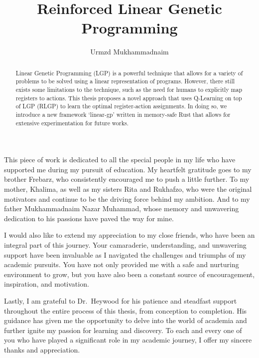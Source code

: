 \documentclass[12pt, final]{dalcsthesis}
\begin{document}
\bcshon
\title{Reinforced Linear Genetic Programming}
\author{Urmzd Mukhammadnaim}

\reader{}

\nolistoftables
\nolistoffigures

\frontmatter

\nocite{*}

\begin{abstract}
	Linear Genetic Programming (LGP) is a powerful technique that allows for a variety of problems to be solved using a linear representation of programs. However, there still exists some limitations to the technique,
	such as the need for humans to explicitly map registers to actions. This thesis proposes a novel approach that uses Q-Learning on top of LGP (RLGP) to learn the optimal register-action assignments. In doing so, we introduce a new framework `linear-gp' written in memory-safe Rust that allows for extensive experimentation for future works.
\end{abstract}

\begin{acknowledgements}
	This piece of work is dedicated to all the special people in my life who have supported me during my pursuit of education. My heartfelt gratitude goes to my brother Frebarz, who consistently encouraged me to push a little further. To my mother, Khalima, as well as my sisters Rita and Rukhafzo, who were the original motivators and continue to be the driving force behind my ambition. And to my father Mukhammadnaim Nazar Muhammad, whose memory and unwavering dedication to his passions have paved the way for mine.

	I would also like to extend my appreciation to my close friends, who have been an integral part of this journey. Your camaraderie, understanding, and unwavering support have been invaluable as I navigated the challenges and triumphs of my academic pursuits. You have not only provided me with a safe and nurturing environment to grow, but you have also been a constant source of encouragement, inspiration, and motivation.

	Lastly, I am grateful to Dr.\ Heywood for his patience and steadfast support throughout the entire process of this thesis, from conception to completion. His guidance has given me the opportunity to delve into the world of academia and further ignite my passion for learning and discovery. To each and every one of you who have played a significant role in my academic journey, I offer my sincere thanks and appreciation.
\end{acknowledgements}
\end{document}
